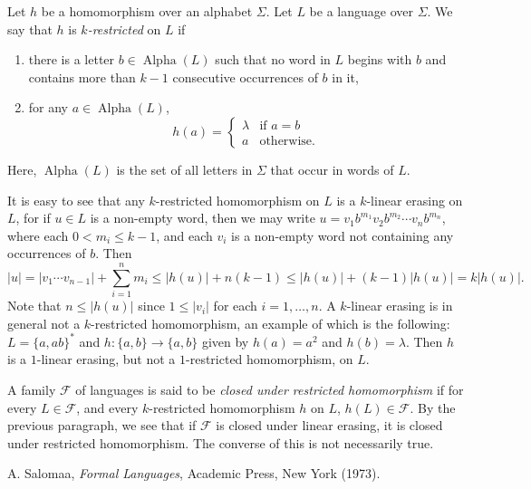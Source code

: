 \documentclass[12pt]{article}
\begin{document}
Let $h$ be a homomorphism over an alphabet $\Sigma$.  Let $L$ be a language over $\Sigma$.  We say that $h$ is \emph{$k$-restricted} on $L$ if
\begin{enumerate}
\item there is a letter $b\in \operatorname{Alpha}(L)$ such that no word in $L$ begins with $b$ and contains more than $k-1$ consecutive occurrences of $b$ in it,
\item for any $a\in \operatorname{Alpha}(L)$,
\begin{displaymath}
h(a) = \left\{
\begin{array}{ll}
\lambda & \textrm{if } a=b \\
a & \textrm{otherwise.}
\end{array}
\right.
\end{displaymath}
\end{enumerate}
Here, $\operatorname{Alpha}(L)$ is the set of all letters in $\Sigma$ that occur in words of $L$.

It is easy to see that any $k$-restricted homomorphism on $L$ is a $k$-linear erasing on $L$, for if $u\in L$ is a non-empty word, then we may write $u=v_1 b^{m_1} v_2 b^{m_2} \cdots v_n b^{m_n}$, where each $0<m_i\le k-1$, and each $v_i$ is a non-empty word not containing any occurrences of $b$.  Then
$$|u| = |v_1\cdots v_{n-1}| + \sum_{i=1}^n m_i \le |h(u)|+n(k-1) \le |h(u)|+(k-1)|h(u)| = k|h(u)|.$$
Note that $n\le |h(u)|$ since $1\le |v_i|$ for each $i=1,\ldots, n$.  A $k$-linear erasing is in general not a $k$-restricted homomorphism, an example of which is the following: $L=\lbrace a,ab\rbrace^*$ and $h:\lbrace a,b\rbrace \to \lbrace a,b\rbrace$ given by $h(a)=a^2$ and $h(b)=\lambda$.  Then $h$ is a $1$-linear erasing, but not a $1$-restricted homomorphism, on $L$.

A family $\mathscr{F}$ of languages is said to be \emph{closed under restricted homomorphism} if for every $L\in \mathscr{F}$, and every $k$-restricted homomorphism $h$ on $L$, $h(L)\in \mathscr{F}$.  By the previous paragraph, we see that if $\mathscr{F}$ is closed under linear erasing, it is closed under restricted homomorphism.  The converse of this is not necessarily true.

\begin{thebibliography}{9}
 A. Salomaa, {\em Formal Languages}, Academic Press, New York (1973).
\end{thebibliography}
\end{document}
